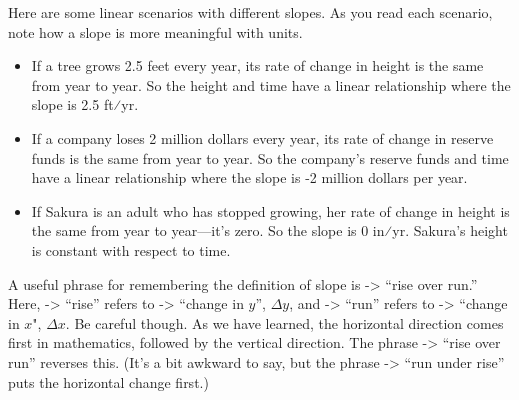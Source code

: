 \documentclass[nooutcomes]{ximera}
\begin{document}
Here are some linear scenarios with different slopes. As you read each scenario, note how a slope is more meaningful with units.
\begin{itemize} 
\item If a tree grows 2.5 feet every year, its rate of change in height is the same from year to year. So the height and time have a linear relationship where the slope is 2.5 ft⁄yr.
\item If a company loses 2 million dollars every year, its rate of change in reserve funds is the same from year to year. So the company's reserve funds and time have a linear relationship where the slope is -2  million dollars per year.
\item If Sakura is an adult who has stopped growing, her rate of change in height is the same from year to year—it's zero. So the slope is 0 in⁄yr. Sakura's height is constant with respect to time.
\end{itemize}


\begin{remark}
A useful phrase for remembering the definition of slope is -> ``rise over run.'' Here, -> ``rise'' refers to -> ``change in $y$'', $\Delta y$, and -> ``run'' refers to -> ``change in $x$", $\Delta x$. Be careful though. As we have learned, the horizontal direction comes first in mathematics, followed by the vertical direction. The phrase -> ``rise over run'' reverses this. (It's a bit awkward to say, but the phrase -> ``run under rise'' puts the horizontal change first.)
\end{remark}
\end{document}
